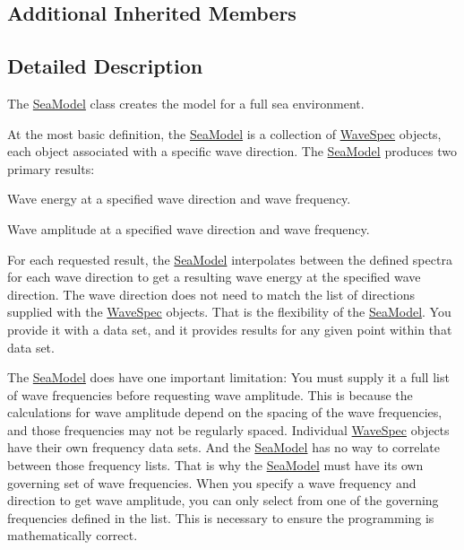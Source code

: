 \subsection*{Additional Inherited Members}


\subsection{Detailed Description}
The \hyperlink{classosea_1_1_sea_model}{Sea\-Model} class creates the model for a full sea environment. 

At the most basic definition, the \hyperlink{classosea_1_1_sea_model}{Sea\-Model} is a collection of \hyperlink{classosea_1_1_wave_spec}{Wave\-Spec} objects, each object associated with a specific wave direction. The \hyperlink{classosea_1_1_sea_model}{Sea\-Model} produces two primary results\-:
\begin{DoxyEnumerate}
\item Wave energy at a specified wave direction and wave frequency.
\item Wave amplitude at a specified wave direction and wave frequency.
\end{DoxyEnumerate}

For each requested result, the \hyperlink{classosea_1_1_sea_model}{Sea\-Model} interpolates between the defined spectra for each wave direction to get a resulting wave energy at the specified wave direction. The wave direction does not need to match the list of directions supplied with the \hyperlink{classosea_1_1_wave_spec}{Wave\-Spec} objects. That is the flexibility of the \hyperlink{classosea_1_1_sea_model}{Sea\-Model}. You provide it with a data set, and it provides results for any given point within that data set.

The \hyperlink{classosea_1_1_sea_model}{Sea\-Model} does have one important limitation\-: You must supply it a full list of wave frequencies before requesting wave amplitude. This is because the calculations for wave amplitude depend on the spacing of the wave frequencies, and those frequencies may not be regularly spaced. Individual \hyperlink{classosea_1_1_wave_spec}{Wave\-Spec} objects have their own frequency data sets. And the \hyperlink{classosea_1_1_sea_model}{Sea\-Model} has no way to correlate between those frequency lists. That is why the \hyperlink{classosea_1_1_sea_model}{Sea\-Model} must have its own governing set of wave frequencies. When you specify a wave frequency and direction to get wave amplitude, you can only select from one of the governing frequencies defined in the list. This is necessary to ensure the programming is mathematically correct.

